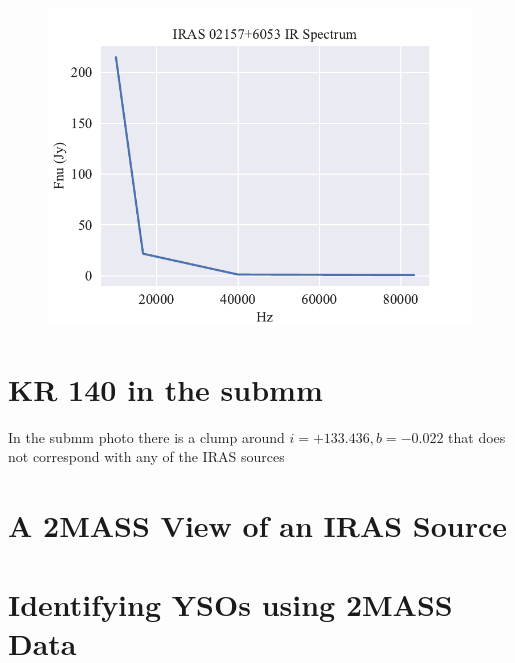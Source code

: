 \documentclass[]{article}
\begin{document}
\begin{figure}
	\centering
	\includegraphics[]{figs/spectrum.pdf}
\end{figure}


\section{KR 140 in the submm}

In the submm photo there is a clump around $i=+133.436, b=-0.022$ that does not correspond with any of the IRAS sources

\section{A 2MASS View of an IRAS Source}



\section{Identifying YSOs using 2MASS Data}
\end{document}
